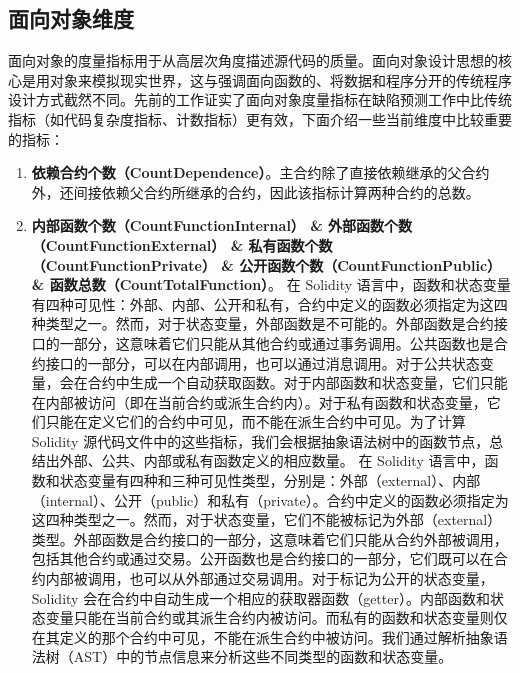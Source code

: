 \subsection{面向对象维度}
\label{sec:面向对象维度}
面向对象的度量指标用于从高层次角度描述源代码的质量。面向对象设计思想的核心是用对象来模拟现实世界，这与强调面向函数的、将数据和程序分开的传统程序设计方式截然不同。先前的工作\cite{martin1994oodesign,basili1996validation,KHAN20071}证实了面向对象度量指标在缺陷预测工作中比传统指标（如代码复杂度指标、计数指标）更有效，下面介绍一些当前维度中比较重要的指标：
\begin{enumerate}[label=\Alph*., align=left, leftmargin=*]

    \item \textbf{依赖合约个数（CountDependence）}。主合约除了直接依赖继承的父合约外，还间接依赖父合约所继承的合约，因此该指标计算两种合约的总数。


    \item \textbf{内部函数个数（CountFunctionInternal） \& 外部函数个数（CountFunctionExternal） \& 私有函数个数（CountFunctionPrivate） \& 公开函数个数（CountFunctionPublic） \& 函数总数（CountTotalFunction）}。 在 Solidity 语言中，函数和状态变量有四种可见性：外部、内部、公开和私有，合约中定义的函数必须指定为这四种类型之一。然而，对于状态变量，外部函数是不可能的。外部函数是合约接口的一部分，这意味着它们只能从其他合约或通过事务调用。公共函数也是合约接口的一部分，可以在内部调用，也可以通过消息调用。对于公共状态变量，会在合约中生成一个自动获取函数。对于内部函数和状态变量，它们只能在内部被访问（即在当前合约或派生合约内）。对于私有函数和状态变量，它们只能在定义它们的合约中可见，而不能在派生合约中可见。为了计算 Solidity 源代码文件中的这些指标，我们会根据抽象语法树中的函数节点，总结出外部、公共、内部或私有函数定义的相应数量。
    在 Solidity 语言中，函数和状态变量有四种和三种可见性类型，分别是：外部（external）、内部（internal）、公开（public）和私有（private）。合约中定义的函数必须指定为这四种类型之一。然而，对于状态变量，它们不能被标记为外部（external）类型。外部函数是合约接口的一部分，这意味着它们只能从合约外部被调用，包括其他合约或通过交易。公开函数也是合约接口的一部分，它们既可以在合约内部被调用，也可以从外部通过交易调用。对于标记为公开的状态变量，Solidity 会在合约中自动生成一个相应的获取器函数（getter）。内部函数和状态变量只能在当前合约或其派生合约内被访问。而私有的函数和状态变量则仅在其定义的那个合约中可见，不能在派生合约中被访问。我们通过解析抽象语法树（AST）中的节点信息来分析这些不同类型的函数和状态变量。
\end{enumerate}
